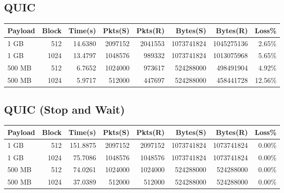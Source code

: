 \documentclass{article}
\begin{document}
\subsection{ QUIC}
\begin{small}
    \begin{longtable}{l r r r r r r r}
        \toprule
        \textbf{Payload} & \textbf{Block} & \textbf{Time(s)} & \textbf{Pkts(S)} & \textbf{Pkts(R)} & \textbf{Bytes(S)} & \textbf{Bytes(R)} & \textbf{Loss\%} \\
        \midrule
        1 GB             & 512            & 14.6380          & 2097152          & 2041553          & 1073741824        & 1045275136        & 2.65\%          \\
        1 GB             & 1024           & 13.4797          & 1048576          & 989332           & 1073741824        & 1013075968        & 5.65\%          \\
        500 MB           & 512            & 6.7652           & 1024000          & 973617           & 524288000         & 498491904         & 4.92\%          \\
        500 MB           & 1024           & 5.9717           & 512000           & 447697           & 524288000         & 458441728         & 12.56\%         \\
        \bottomrule
    \end{longtable}
\end{small}
\subsection{ QUIC (Stop and Wait)}
\begin{small}
    \begin{longtable}{l r r r r r r r}
        \toprule
        \textbf{Payload} & \textbf{Block} & \textbf{Time(s)} & \textbf{Pkts(S)} & \textbf{Pkts(R)} & \textbf{Bytes(S)} & \textbf{Bytes(R)} & \textbf{Loss\%} \\
        \midrule
        1 GB             & 512            & 151.8875         & 2097152          & 2097152          & 1073741824        & 1073741824        & 0.00\%          \\
        1 GB             & 1024           & 75.7086          & 1048576          & 1048576          & 1073741824        & 1073741824        & 0.00\%          \\
        500 MB           & 512            & 74.0261          & 1024000          & 1024000          & 524288000         & 524288000         & 0.00\%          \\
        500 MB           & 1024           & 37.0389          & 512000           & 512000           & 524288000         & 524288000         & 0.00\%          \\
        \bottomrule
    \end{longtable}
\end{small}
\end{document}

